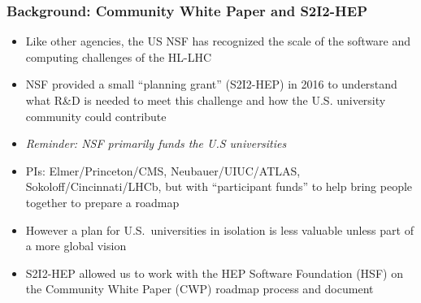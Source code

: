 \begin{frame}
\frametitle{Background: Community White Paper and S2I2-HEP}

\begin{itemize}
\item Like other agencies, the US NSF has recognized the scale of the software and computing challenges of the HL-LHC
\item NSF provided a small ``planning grant'' (S2I2-HEP) in 2016 to understand what R\&D is needed to meet this challenge and how the U.S. university community could contribute
\item {\it Reminder: NSF primarily funds the U.S universities}
\item PIs: Elmer/Princeton/CMS, Neubauer/UIUC/ATLAS, Sokoloff/Cincinnati/LHCb, but with ``participant funds'' to help bring people together to prepare a roadmap
\item However a plan for U.S.\ universities in isolation is less valuable unless part of a more global vision
\item S2I2-HEP allowed us to work with the HEP Software Foundation (HSF) on the Community White Paper (CWP) roadmap process and document 
\end{itemize}

\end{frame}


